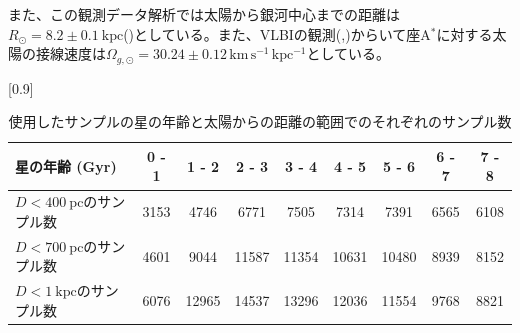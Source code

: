 また、この観測データ解析では太陽から銀河中心までの距離は$R_{\odot} = 8.2\pm 0.1\ \mathrm{kpc}$(\cite{BH2016})としている。また、VLBIの観測(\cite{RB04},\cite{Reid08})からいて座A$^*$に対する太陽の接線速度は$\Omega_{g,\odot} = 30.24 \pm 0.12\,\mathrm{km\,s^{-1}\,kpc^{-1}}$としている。



\begin{table}
\small
\begin{center}
\scalebox{0.87}[0.9]{
\begin{tabular}{|l|cccccccc|} \hline
    星の年齢 (Gyr) & 0 - 1 & 1 - 2 & 2 - 3 & 3 - 4 & 4 - 5 & 5 - 6 & 6 - 7 & 7 - 8\\ \hline
    $D<400\ \mathrm{pc}$のサンプル数& 3153 & 4746 & 6771 & 7505 & 7314 & 7391 & 6565 & 6108\\
    $D<700\ \mathrm{pc}$のサンプル数 & 4601 & 9044 & 11587 & 11354 & 10631 & 10480 & 8939 & 8152\\
    $D<1\ \mathrm{kpc}$のサンプル数  & 6076 & 12965 & 14537 & 13296 & 12036 & 11554 & 9768 & 8821\\ \hline
\end{tabular}
}
\caption{使用したサンプルの星の年齢と太陽からの距離の範囲でのそれぞれのサンプル数}
\label{dataset}
\end{center}
\end{table}


